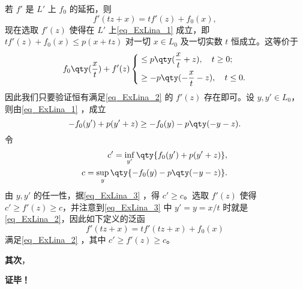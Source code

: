 若 $f'$ 是 $L'$ 上 $f_0$ 的延拓，则
\begin{equation}
f'(tz+x)=tf'(z)+f_0(x),~
\end{equation}
现在选取 $f'(z)$ 使得在 $L'$ 上\autoref{eq_ExLina_1} 成立，即 $tf'(z)+f_0(x)\leq p(x+tz)$ 对一切 $x\in L_0$ 及一切实数 $t$ 恒成立。这等价于
\begin{equation}\label{eq_ExLina_2}
f_0\qty(\frac{x}{t})+f'(z)\left\{\begin{aligned}
&\leq p\qty(\frac{x}{t}+z),\quad t\geq 0;\\
&\geq -p\qty(-\frac{x}{t}-z),\quad t\leq 0.
\end{aligned}\right.
~
\end{equation}
因此我们只要验证恒有满足\autoref{eq_ExLina_2} 的 $f'(z)$ 存在即可。设 $y,y'\in L_0$，则由\autoref{eq_ExLina_1} ，成立
\begin{equation}\label{eq_ExLina_3}
-f_0(y')+p(y'+z)\geq -f_0(y)-p\qty(-y-z).~
\end{equation}
 令 
 \begin{equation}
 \begin{aligned}
 c'=\inf_{y'}\qty{f_0(y')+p(y'+z)},\\
 c=\sup_y\qty{-f_0(y)-p\qty(-y-z)}.
 \end{aligned}~
 \end{equation}
 由 $y,y'$ 的任一性，据\autoref{eq_ExLina_3} ，得 $c'\geq c$。选取 $f'(z)$ 使得 $c'\geq f'(z)\geq c$，并注意到\autoref{eq_ExLina_3} 中 $y'=y=x/t$ 时就是\autoref{eq_ExLina_2}，因此如下定义的泛函 
 \begin{equation}
 f'(tz+x)=tf'(tz+x)+f_0(x)~
 \end{equation}
 满足\autoref{eq_ExLina_2} ，其中 $c'\geq f'(z)\geq c$。

\textbf{其次}，

\textbf{证毕！}



